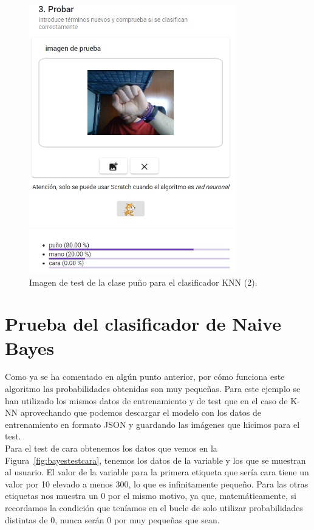 \documentclass[a4paper, 12pt]{book}
\begin{document}
\begin{figure}
	\centering
	\includegraphics[width=9cm, keepaspectratio]{img/testpunoknnmal}
	\caption{Imagen de test de la clase puño para el clasificador KNN (2).}			
	\label{fig:testpunoknnmal}
\end{figure}



\section{Prueba del clasificador de Naive Bayes} 
\label{sec:pruebabayes}

Como ya se ha comentado en algún punto anterior, por cómo funciona este algoritmo las probabilidades obtenidas son muy pequeñas. Para este ejemplo se han utilizado los mismos datos de entrenamiento y de test que en el caso de K-NN aprovechando que podemos descargar el modelo con los datos de entrenamiento en formato JSON y guardando las imágenes que hicimos para el test.\\
Para el test de cara obtenemos los datos que vemos en la Figura~\ref{fig:bayestestcara}, tenemos los datos de la variable y los que se muestran al usuario. El valor de la variable para la primera etiqueta que sería cara tiene un valor por 10 elevado a menos 300, lo que es infinitamente pequeño. Para las otras etiquetas nos muestra un 0 por el mismo motivo, ya que, matemáticamente, si recordamos la condición que teníamos en el bucle de solo utilizar probabilidades distintas de 0, nunca serán 0 por muy pequeñas que sean.
\end{document}

